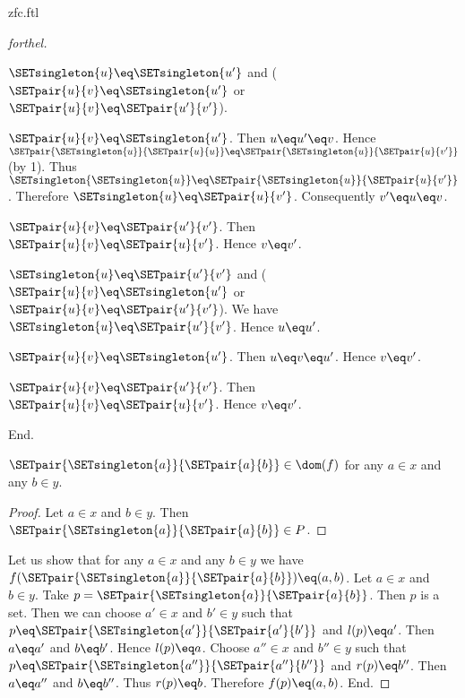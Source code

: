 \documentclass{naproche-library}
\begin{document}
\begin{smodule}[title=ZFC]{zfc.ftl}
\begin{proof}[forthel]
\begin{case}{$\SETsingleton{u} \eq \SETsingleton{u'}$ and ($\SETpair{u}{v} \eq \SETsingleton{u'}$ or $\SETpair{u}{v} \eq \SETpair{u'}{v'}$).}
      \begin{case}{$\SETpair{u}{v} \eq \SETsingleton{u'}$.}
        Then $u \eq u'\eq v$.
        Hence $\SETpair{\SETsingleton{u}}{\SETpair{u}{u}} \eq \SETpair{\SETsingleton{u}}{\SETpair{u}{v'}}$ (by 1).
        Thus $\SETsingleton{\SETsingleton{u}} \eq \SETpair{\SETsingleton{u}}{\SETpair{u}{v'}}$.
        Therefore $\SETsingleton{u} \eq \SETpair{u}{v'}$.
        Consequently $v' \eq u \eq v$.
      \end{case}

      \begin{case}{$\SETpair{u}{v} \eq \SETpair{u'}{v'}$.}
        Then $\SETpair{u}{v} \eq \SETpair{u}{v'}$.
        Hence $v \eq v'$.
      \end{case}
    \end{case}

    \begin{case}{$\SETsingleton{u} \eq \SETpair{u'}{v'}$ and ($\SETpair{u}{v} \eq \SETsingleton{u'}$ or $\SETpair{u}{v} \eq \SETpair{u'}{v'}$).}
      We have $\SETsingleton{u} \eq \SETpair{u'}{v'}$.
      Hence $u \eq u'$.

      \begin{case}{$\SETpair{u}{v} \eq \SETsingleton{u'}$.}
        Then $u \eq v \eq u'$.
        Hence $v \eq v'$.
      \end{case}

      \begin{case}{$\SETpair{u}{v} \eq \SETpair{u'}{v'}$.}
        Then $\SETpair{u}{v} \eq \SETpair{u}{v'}$.
        Hence $v \eq v'$.
      \end{case}
    \end{case}
  End.

  $\SETpair{\SETsingleton{a}}{\SETpair{a}{b}} \in \dom(f)$ for any $a \in x$ and any $b \in y$. %
  \begin{proof}
    Let $a \in x$ and $b \in y$.
    Then $\SETpair{\SETsingleton{a}}{\SETpair{a}{b}} \in P$.
  \end{proof}

  Let us show that for any $a \in x$ and any $b \in y$ we have $f(\SETpair{\SETsingleton{a}}{\SETpair{a}{b}}) \eq (a,b)$.
    Let $a \in x$ and $b \in y$.
    Take $p = \SETpair{\SETsingleton{a}}{\SETpair{a}{b}}$.
    Then $p$ is a set.
    Then we can choose $a' \in x$ and $b' \in y$ such that $p \eq \SETpair{\SETsingleton{a'}}{\SETpair{a'}{b'}}$ and $l(p) \eq a'$.
    Then $a \eq a'$ and $b \eq b'$.
    Hence $l(p) \eq a$.
    Choose $a'' \in x$ and $b'' \in y$ such that $p \eq \SETpair{\SETsingleton{a''}}{\SETpair{a''}{b''}}$ and $r(p) \eq b''$.
    Then $a \eq a''$ and $b \eq b''$.
    Thus $r(p) \eq b$.
    Therefore $f(p) \eq (a,b)$.
  End.


\end{proof}
\end{smodule}
\end{document}
